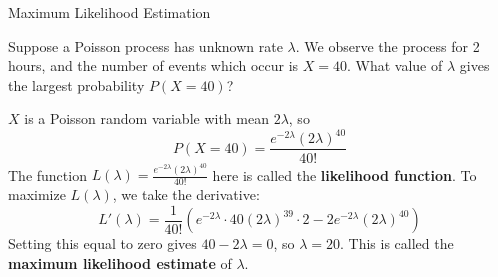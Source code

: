 \documentclass{beamer}
\renewcommand{\emph}{\textbf}
\begin{document}
%
%

\begin{frame}{Maximum Likelihood Estimation}
\begin{block}{}
Suppose a Poisson process has unknown rate $\lambda$. We observe the process for 2 hours, and the number of events which occur is $X=40$. What value of $\lambda$ gives the largest probability $P(X=40)$?
\end{block}
\pause $X$ is a Poisson random variable with mean $2\lambda$, so
$$P(X=40) = \frac{e^{-2\lambda}(2\lambda)^{40}}{40!}$$
\pause The function $L(\lambda)=\frac{e^{-2\lambda}(2\lambda)^{40}}{40!}$ here is called the \emph{likelihood function}. \pause To maximize $L(\lambda)$, we take the derivative:
$$L'(\lambda) = 
\frac1{40!}(e^{-2\lambda}\cdot40(2\lambda)^{39}\cdot2-2e^{-2\lambda}(2\lambda)^{40})$$
\pause Setting this equal to zero gives $40-2\lambda=0$, so $\lambda=20$. This is called the \emph{maximum likelihood estimate} of $\lambda$.
\end{frame}
\end{document}
